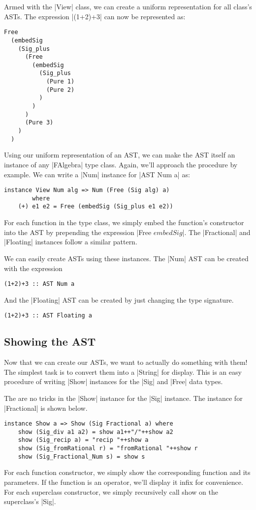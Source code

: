 \documentclass[preprint]{sigplanconf}
\theoremstyle{definition}
\begin{document}
Armed with the |View| class, we can create a uniform representation for all class's ASTs.
The expression |(1+2)+3| can now be represented as:
\begin{lstlisting}
Free
  (embedSig
    (Sig_plus
      (Free
        (embedSig
          (Sig_plus
            (Pure 1)
            (Pure 2)
          )
        )
      )
      (Pure 3)
    )
  )
\end{lstlisting}

Using our uniform representation of an AST,
we can make the AST itself an instance of any |FAlgebra| type class.
Again, we'll approach the procedure by example.
We can write a |Num| instance for |AST Num a| as:
\begin{lstlisting}
instance View Num alg => Num (Free (Sig alg) a)
        where
    (+) e1 e2 = Free (embedSig (Sig_plus e1 e2))
\end{lstlisting}
For each function in the type class,
we simply embed the function's constructor into the AST by prepending the expression |Free $ embedSig $|.
The |Fractional| and |Floating| instances follow a similar pattern.

We can easily create ASTs using these instances.
The |Num| AST can be created with the expression
\begin{lstlisting}
(1+2)+3 :: AST Num a
\end{lstlisting}
And the |Floating| AST can be created by just changing the type signature.
\begin{lstlisting}
(1+2)+3 :: AST Floating a
\end{lstlisting}

\subsection{Showing the AST}
Now that we can create our ASTs, we want to actually do something with them!
The simplest task is to convert them into a |String| for display.
This is an easy procedure of writing |Show| instances for the |Sig| and |Free| data types.

The are no tricks in the |Show| instance for the |Sig| instance.
The instance for |Fractional| is shown below.
\begin{lstlisting}
instance Show a => Show (Sig Fractional a) where
    show (Sig_div a1 a2) = show a1++"/"++show a2
    show (Sig_recip a) = "recip "++show a
    show (Sig_fromRational r) = "fromRational "++show r
    show (Sig_Fractional_Num s) = show s
\end{lstlisting}
For each function constructor, we simply show the corresponding function and its parameters.
If the function is an operator, we'll display it infix for convenience.
For each superclass constructor, we simply recursively call show on the superclass's |Sig|.
\end{document}
